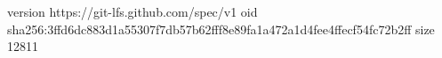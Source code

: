 version https://git-lfs.github.com/spec/v1
oid sha256:3ffd6dc883d1a55307f7db57b62fff8e89fa1a472a1d4fee4ffecf54fc72b2ff
size 12811
